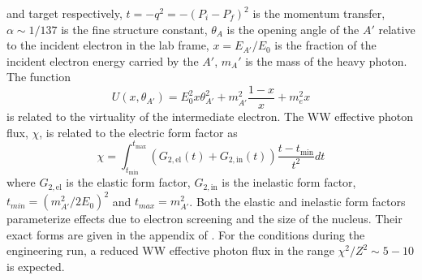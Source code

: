 and target respectively, $t = -q^2 = -(P_{i} - P_{f})^2$ is the momentum transfer, 
$\alpha \sim 1/137$ is the fine structure constant, $\theta_{A}$ is the
opening angle of the $A'$ relative to the incident electron in the lab frame, 
$x = E_{A'}/E_{0}$ is the fraction of the incident electron energy carried by
the $A'$, $m_A'$ is the mass of the heavy photon. The function 
\begin{equation}
    U(x, \theta_{A'}) = E_{0}^{2}x\theta_{A'}^{2} 
    + m_{A'}^{2}\frac{1-x}{x} + m_{e}^2 x
\end{equation}
is related to the virtuality of the intermediate electron.  The WW effective
photon flux, $\chi$, is related to the electric form factor as
\begin{equation}
    \chi = \int_{t_{\text{min}}}^{t_{\text{max}}} \left(G_{2,\text{el}}(t) + G_{2,\text{in}}(t) \right) \frac{t - t_{\text{min}}}{t^2} dt
\end{equation}
where $G_{2,\text{el}}$ is the elastic form factor, $G_{2,\text{in}}$ is the inelastic form
factor, $t_{min} = (m^2_{A'}/2E_{0})^2$ and $t_{max} = m_{A'}^2$.  Both the 
elastic and inelastic form factors parameterize effects due to electron screening
and the size of the nucleus.  Their exact forms are given in the appendix of 
\cite{Bjorken:2009mm}.  For the conditions during the engineering run, a reduced
WW effective photon flux in the range $\chi^2/Z^2 \sim 5 - 10$ is expected.

